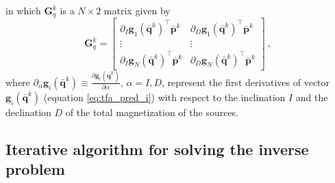 in which $\mathbf{G}_{q}^{k}$ is a $N \times 2$ matrix given by 
\begin{equation}
\mathbf{G}_{q}^{k} = \begin{bmatrix}
\partial_{I} \mathbf{g}_{1}(\bar{\mathbf{q}}^{k})^{\top} \bar{\mathbf{p}}^{k} & 
\partial_{D} \mathbf{g}_{1}(\bar{\mathbf{q}}^{k})^{\top} \bar{\mathbf{p}}^{k} \\
\vdots & \vdots  \\
\partial_{I} \mathbf{g}_{N}(\bar{\mathbf{q}}^{k})^{\top} \bar{\mathbf{p}}^{k} & 
\partial_{D} \mathbf{g}_{N}(\bar{\mathbf{q}}^{k})^{\top} \bar{\mathbf{p}}^{k} 
\end{bmatrix} \: ,
\label{eq:Gq}
\end{equation}
where 
$\partial_{\alpha} \mathbf{g}_{i}(\bar{\mathbf{q}}^{k}) \equiv 
\frac{\partial \mathbf{g}_{i}(\bar{\mathbf{q}}^{k})}{\partial \alpha}$, $\alpha= I, D$, 
represent the first derivatives of vector 
$\mathbf{g}_{i}(\bar{\mathbf{q}}^{k})$ (equation \ref{eq:tfa_pred_i}) with respect to the 
inclination $I$ and the declination $D$ of the total magnetization of the sources.

\subsection{Iterative algorithm for solving the inverse problem}

